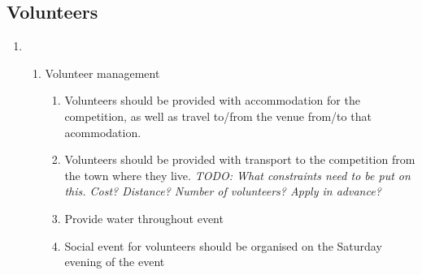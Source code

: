 \subsection{Volunteers}
  \begin{enumerate}
\item   \begin{enumerate}

\item Volunteer management
  \begin{enumerate}
  \item Volunteers should be provided with accommodation for the competition, as well as travel to/from the venue from/to that acommodation.
  \item Volunteers should be provided with transport to the competition from the town where they live. \textit{TODO: What constraints need to be put on this.  Cost?  Distance?  Number of volunteers?  Apply in advance?}

  \item Provide water throughout event
  \item Social event for volunteers should be organised on the Saturday evening of the event

  \end{enumerate}
  \end{enumerate}
  \end{enumerate}

